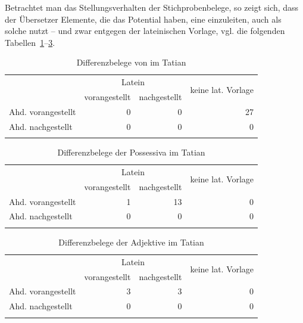 Betrachtet man das Stellungsverhalten der Stichprobenbelege, so zeigt sich, dass der Übersetzer Elemente, die das Potential haben, eine  einzuleiten, auch als solche nutzt -- und zwar entgegen der lateinischen Vorlage, vgl. die folgenden Tabellen~\ref{tab:diff-ther-tatian}--\ref{tab:diff-adj-tatian}.  

\begin{table}
\centering
\begin{tabular}{lrrr}
\lsptoprule
& \multicolumn{2}{c}{Latein} & \multirow{2}{*}{keine lat. Vorlage}\\
 \cmidrule(lr){2-3}
                   & vorangestellt & nachgestellt & \\ \midrule
Ahd. vorangestellt & 0                  & 0                 & 27                    \\
Ahd. nachgestellt  & 0                  & 0                 & 0                    \\ \lspbottomrule
\end{tabular}
\caption{Differenzbelege  von  im Tatian}
\label{tab:diff-ther-tatian}
\end{table}

\begin{table}
\centering
\begin{tabular}{lrrr}
\lsptoprule
                   & \multicolumn{2}{c}{Latein} & \multirow{2}{*}{keine lat. Vorlage}\\
 \cmidrule(lr){2-3}
                   & vorangestellt & nachgestellt & \\ \midrule
Ahd. vorangestellt & 1                  & 13                 & 0                    \\
Ahd. nachgestellt  & 0                  & 0                 & 0                    \\ \lspbottomrule
\end{tabular}
\caption{Differenzbelege der Possessiva  im Tatian}
\label{tab:diff-poss-tatian}
\end{table}

\begin{table}
\centering
\begin{tabular}{lrrr}
\lsptoprule
                   & \multicolumn{2}{c}{Latein} & \multirow{2}{*}{keine lat. Vorlage}\\
 \cmidrule(lr){2-3}
                   & vorangestellt & nachgestellt & \\ \midrule
Ahd. vorangestellt & 3                  & 3                & 0                    \\
Ahd. nachgestellt  & 0                  & 0                 & 0                    \\ \lspbottomrule
\end{tabular}
\caption{Differenzbelege  der Adjektive  im Tatian}
\label{tab:diff-adj-tatian}
\end{table}


